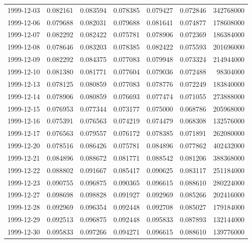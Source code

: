 \begin{tabular}{lrrrrrr}
1999-12-03 &    0.082161 &    0.083594 &    0.078385 &    0.079427 &    0.072846 &   342768000 \\
1999-12-06 &    0.079688 &    0.082031 &    0.079688 &    0.081641 &    0.074877 &   178608000 \\
1999-12-07 &    0.082292 &    0.082422 &    0.075781 &    0.078906 &    0.072369 &   186384000 \\
1999-12-08 &    0.078646 &    0.083203 &    0.078385 &    0.082422 &    0.075593 &   201696000 \\
1999-12-09 &    0.082292 &    0.084375 &    0.077083 &    0.079948 &    0.073324 &   214944000 \\
1999-12-10 &    0.081380 &    0.081771 &    0.077604 &    0.079036 &    0.072488 &    98304000 \\
1999-12-13 &    0.078125 &    0.080859 &    0.077083 &    0.078776 &    0.072249 &   183840000 \\
1999-12-14 &    0.078906 &    0.080859 &    0.076693 &    0.077474 &    0.071055 &   273888000 \\
1999-12-15 &    0.076953 &    0.077344 &    0.073177 &    0.075000 &    0.068786 &   205968000 \\
1999-12-16 &    0.075391 &    0.076563 &    0.074219 &    0.074479 &    0.068308 &   132576000 \\
1999-12-17 &    0.076563 &    0.079557 &    0.076172 &    0.078385 &    0.071891 &   262080000 \\
1999-12-20 &    0.078516 &    0.086426 &    0.075781 &    0.084896 &    0.077862 &   402432000 \\
1999-12-21 &    0.084896 &    0.088672 &    0.081771 &    0.088542 &    0.081206 &   388368000 \\
1999-12-22 &    0.088802 &    0.091667 &    0.085417 &    0.090625 &    0.083117 &   251184000 \\
1999-12-23 &    0.090755 &    0.096875 &    0.090365 &    0.096615 &    0.088610 &   280224000 \\
1999-12-27 &    0.098698 &    0.098828 &    0.091927 &    0.092969 &    0.085266 &   202416000 \\
1999-12-28 &    0.092969 &    0.096354 &    0.092448 &    0.092708 &    0.085027 &   179184000 \\
1999-12-29 &    0.092513 &    0.096875 &    0.092448 &    0.095833 &    0.087893 &   132144000 \\
1999-12-30 &    0.095833 &    0.097266 &    0.094271 &    0.096615 &    0.088610 &   139776000 \\

\end{tabular}
